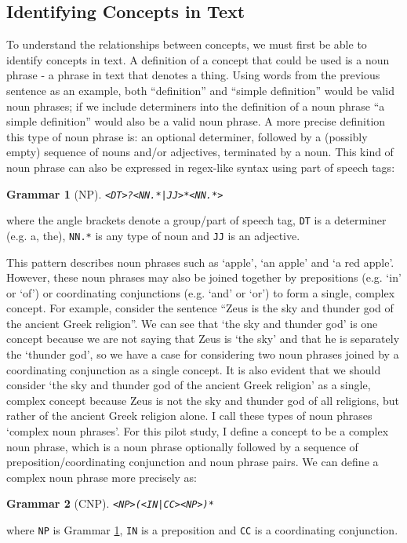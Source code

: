 \documentclass[12pt]{article}
\theoremstyle{grammarstyle}
\newtheorem{gram}{Grammar}
\begin{document}
\subsection{Identifying Concepts in Text} \label{sec:idenifying_concepts}
To understand the relationships between concepts, we must first be able to identify concepts in text. A definition of a concept that could be used is a noun phrase - a phrase in text that denotes a thing. Using words from the previous sentence as an example, both ``definition'' and ``simple definition'' would be valid noun phrases; if we include determiners into the definition of a noun phrase ``a simple definition'' would also be a valid noun phrase. A more precise definition this type of noun phrase is: an optional determiner, followed by a (possibly empty) sequence of nouns and/or adjectives, terminated by a noun. This kind of noun phrase can also be expressed in regex-like syntax using part of speech tags:
\begin{gram}[NP] \label{gr:np_pattern}
\texttt{<DT>?<NN.*|JJ>*<NN.*>}
\end{gram}
\noindent
where the angle brackets denote a group/part of speech tag, \texttt{DT} is a determiner (e.g. a, the), \texttt{NN.*} is any type of noun and \texttt{JJ} is an adjective.

This pattern describes noun phrases such as `apple', `an apple' and `a red apple'. However, these noun phrases may also be joined together by prepositions (e.g. `in' or `of') or coordinating conjunctions (e.g. `and' or `or') to form a single, complex concept. For example, consider the sentence ``Zeus is the sky and thunder god of the ancient Greek religion''. We can see that `the sky and thunder god' is one concept because we are not saying that Zeus is `the sky' and that he is separately the `thunder god', so we have a case for considering two noun phrases joined by a coordinating conjunction as a single concept. It is also evident that we should consider `the sky and thunder god of the ancient Greek religion' as a single, complex concept because Zeus is not the sky and thunder god of all religions, but rather of the ancient Greek religion alone.
I call these types of noun phrases `complex noun phrases'. For this pilot study, I define a concept to be a complex noun phrase, which is a noun phrase optionally followed by a sequence of preposition/coordinating conjunction and noun phrase pairs. We can define a complex noun phrase more precisely as:
\begin{gram}[CNP] \label{gr:cnp_pattern}
    \texttt{<NP>(<IN|CC><NP>)*}
\end{gram}
\noindent
where \texttt{NP} is Grammar \ref{gr:np_pattern}, \texttt{IN} is a preposition and \texttt{CC} is a coordinating conjunction.
\end{document}
